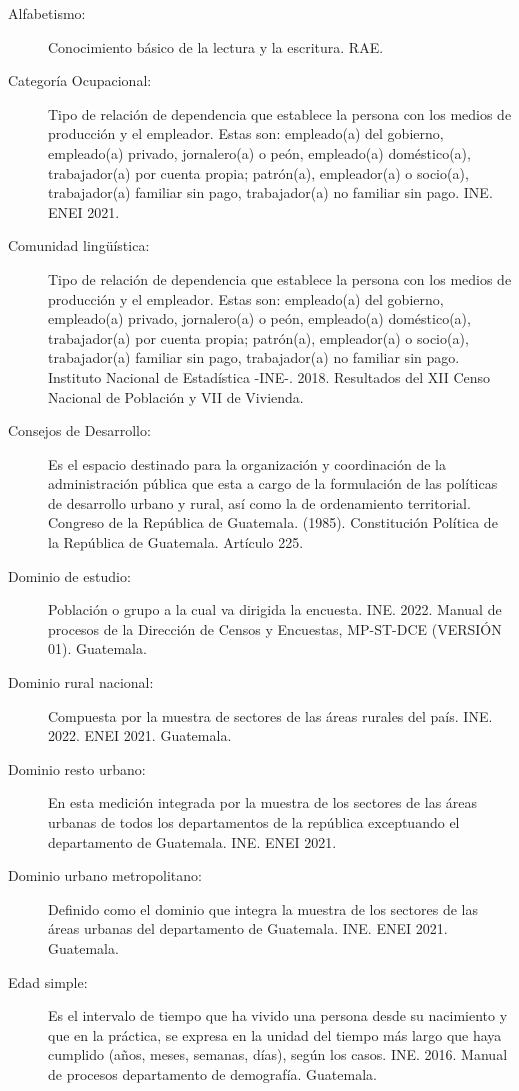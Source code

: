 \begin{description}
	\item[Alfabetismo:] Conocimiento básico de la lectura y la escritura. RAE.
	\item [Categoría Ocupacional:] Tipo de relación de dependencia que establece la persona con los medios de producción y el empleador. Estas son: empleado(a) del gobierno, empleado(a) privado, jornalero(a) o peón, empleado(a) doméstico(a), trabajador(a) por cuenta propia; patrón(a), empleador(a) o socio(a), trabajador(a) familiar sin pago, trabajador(a) no familiar sin pago. INE. ENEI 2021.
	\item[Comunidad lingüística:] Tipo de relación de dependencia que establece la persona con los medios de producción y el empleador. Estas son: empleado(a) del gobierno, empleado(a) privado, jornalero(a) o peón, empleado(a) doméstico(a), trabajador(a) por cuenta propia; patrón(a), empleador(a) o socio(a), trabajador(a) familiar sin pago, trabajador(a) no familiar sin pago. Instituto Nacional de Estadística -INE-. 2018. Resultados del XII Censo Nacional de Población y VII de Vivienda.
	\item[Consejos de Desarrollo:] Es el espacio destinado para la organización y coordinación de la administración pública que esta a cargo de la formulación de las políticas de desarrollo urbano y rural, así como la de ordenamiento territorial. Congreso de la República de Guatemala. (1985). Constitución Política de la República de Guatemala. Artículo 225.
	\item[Dominio de estudio:] Población o grupo a la cual va dirigida la encuesta. INE. 2022. Manual de procesos de la Dirección de Censos y Encuestas, MP-ST-DCE (VERSIÓN 01). Guatemala.
	\item[Dominio rural nacional:] Compuesta por la muestra de sectores de las áreas rurales del país. INE. 2022. ENEI 2021. Guatemala.
	\item[Dominio resto urbano:] En esta medición integrada por la muestra de los sectores de las áreas urbanas de todos los departamentos de la república exceptuando el departamento de Guatemala. INE. ENEI 2021.
	\item[Dominio urbano metropolitano:] Definido como el dominio que integra la muestra de los sectores de las áreas urbanas del departamento de Guatemala. INE. ENEI 2021. Guatemala.
	\item[Edad simple:] Es el intervalo de tiempo que ha vivido una persona desde su nacimiento y que en la práctica, se expresa en la unidad del tiempo más largo que haya cumplido (años, meses, semanas, días), según los casos. INE. 2016. Manual de procesos departamento de demografía. Guatemala.

\end{description}
